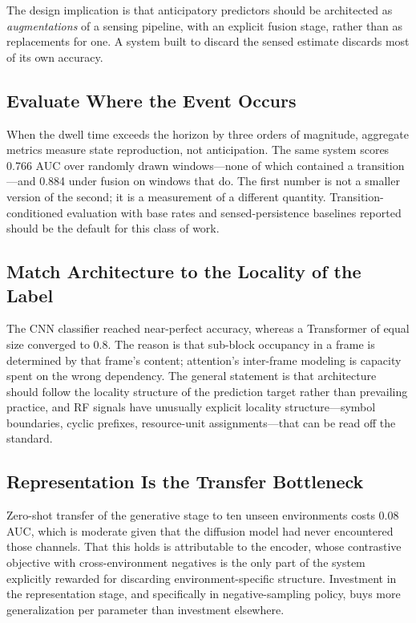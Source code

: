 \documentclass[lettersize,journal]{IEEEtran}
\begin{document}
The design implication is that anticipatory predictors should be
architected as \emph{augmentations} of a sensing pipeline, with an
explicit fusion stage, rather than as replacements for one. A system
built to discard the sensed estimate discards most of its own accuracy.

\subsection{\textbf{Evaluate Where the Event Occurs}}
When the dwell time exceeds the horizon by three orders of magnitude,
aggregate metrics measure state reproduction, not anticipation. The
same system scores 0.766 AUC over randomly drawn windows---none of which
contained a transition---and 0.884 under fusion on windows that do. The
first number is not a smaller version of the second; it is a
measurement of a different quantity. Transition-conditioned evaluation
with base rates and sensed-persistence baselines reported should be the
default for this class of work.

\subsection{\textbf{Match Architecture to the Locality of the Label}}
The CNN classifier reached near-perfect accuracy, whereas a Transformer of
equal size converged to 0.8. The reason is that sub-block occupancy in a
frame is determined by that frame's content; attention's inter-frame
modeling is capacity spent on the wrong dependency. The general
statement is that architecture should follow the locality structure of
the prediction target rather than prevailing practice, and RF signals
have unusually explicit locality structure---symbol boundaries, cyclic
prefixes, resource-unit assignments---that can be read off the standard.

\subsection{\textbf{Representation Is the Transfer Bottleneck}}
Zero-shot transfer of the generative stage to ten unseen environments
costs 0.08 AUC, which is moderate given that the diffusion model had
never encountered those channels. That this holds is attributable to the
encoder, whose contrastive objective with cross-environment negatives is
the only part of the system explicitly rewarded for discarding
environment-specific structure. Investment in the representation stage,
and specifically in negative-sampling policy, buys more generalization
per parameter than investment elsewhere.
\end{document}
